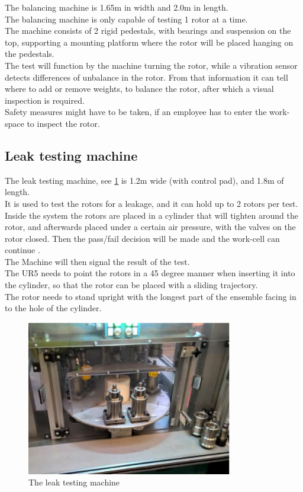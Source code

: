  The balancing machine is 1.65m in width and 2.0m in length.\\
 The balancing machine is only capable of testing 1 rotor at a time.\\
 The machine consists of 2 rigid pedestals, with bearings and suspension on the top, supporting a mounting platform where the rotor will be placed hanging on the pedestals.\\

The test will function by the machine turning the rotor, while a vibration sensor detects differences of unbalance in the rotor. From that information it can tell where to add or remove weights, to balance the rotor, after which a visual inspection is required.\\

Safety measures might have to be taken, if an employee has to enter the work-space to inspect the rotor.
 


 \subsection{Leak testing machine}
 
 The leak testing machine, see \ref{fig:Leak testing machine} is 1.2m wide (with control pad), and 1.8m of length.\\ 
 It is used to test the rotors for a leakage, and it can hold up to 2 rotors per test.\\
 Inside the system the rotors are placed in a cylinder that will tighten around the rotor, and afterwards placed under a certain air pressure, with the valves on the rotor closed. Then the pass/fail decision will be made and the work-cell can continue \cite{LEAK}.\\
 The Machine will then signal the result of the test.\\
 
The UR5 needs to point the rotors in a 45 degree manner when inserting it into the cylinder, so that the rotor can be placed with a sliding trajectory.\\
The rotor needs to stand upright with the longest part of the ensemble facing in to the hole of the cylinder. 
 
 \begin{figure}[h]
    \centering
    \includegraphics[width=9cm]{InitialProblemstatement/Case/Leaktest.PNG}
    \caption{The leak testing machine\cite{Case}}
    \label{fig:Leak testing machine}
\end{figure}
 
